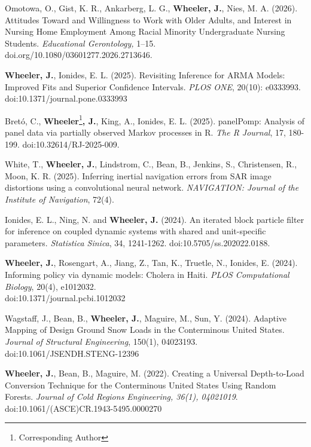 \documentclass[11pt]{article}
\newenvironment {reflist}
                {
                 \begin{list}{}
                 {\setlength{\labelwidth}{0mm}
                  \setlength{\leftmargin}{8mm}
                  \setlength{\itemindent}{-3mm}
                  \setlength{\labelsep}{0mm}
                  \setlength{\parsep}{0.1 ex}
                  \setlength{\itemsep}{0.1cm}
      \setlength{\topsep}{0.15cm}}} %
   {\end{list}}
\begin{document}
\begin{reflist}

    \item Omotowa, O., Gist, K. R., Ankarberg, L. G., \textbf{Wheeler, J.}, Nies, M. A. (2026).  Attitudes Toward and Willingness to Work with Older Adults, and Interest in Nursing Home Employment Among Racial Minority Undergraduate Nursing Students. {\it Educational Gerontology,} 1--15.
    \\ doi.org/10.1080/03601277.2026.2713646.
    
    \item \textbf{Wheeler, J.}, Ionides, E. L. (2025). Revisiting Inference for ARMA Models: Improved Fits and Superior Confidence Intervals. {\it PLOS ONE}, 20(10): e0333993. doi:10.1371/journal.pone.0333993

    \item Bret\'o, C., \textbf{Wheeler}\footnote{Corresponding Author}\textbf{, J.}, King, A., Ionides, E. L. (2025). panelPomp: Analysis of panel data via partially observed Markov processes in R. {\it The R Journal}, 17, 180-199. doi:10.32614/RJ-2025-009.

    \item White, T., \textbf{Wheeler, J.}, Lindstrom, C., Bean, B., Jenkins, S., Christensen, R., Moon, K. R. (2025). Inferring inertial navigation errors from SAR image distortions using a convolutional neural network. {\it NAVIGATION: Journal of the Institute of Navigation}, 72(4). 

    \item Ionides, E. L., Ning, N. and \textbf{Wheeler, J.} (2024). An iterated block particle filter for inference on coupled dynamic systems with shared and unit-specific parameters. {\it Statistica Sinica}, 34, 1241-1262. doi:10.5705/ss.202022.0188.

    \item \textbf{Wheeler, J.}, Rosengart, A., Jiang, Z., Tan, K., Truetle, N., Ionides, E. (2024). Informing policy via dynamic models: Cholera in Haiti. {\it PLOS Computational Biology}, 20(4), e1012032. \\ doi:10.1371/journal.pcbi.1012032

    \item Wagstaff, J., Bean, B., \textbf{Wheeler, J.}, Maguire, M., Sun, Y. (2024). Adaptive Mapping of Design Ground Snow Loads in the Conterminous United States. {\it Journal of Structural Engineering}, 150(1), 04023193. doi:10.1061/JSENDH.STENG-12396

    \item \textbf{Wheeler, J.}, Bean, B., Maguire, M. (2022). Creating a Universal Depth-to-Load Conversion Technique for the Conterminous United States Using Random Forests. {\it Journal of Cold Regions Engineering, 36(1), 04021019}. doi:10.1061/(ASCE)CR.1943-5495.0000270


\end{reflist}
\end{document}
